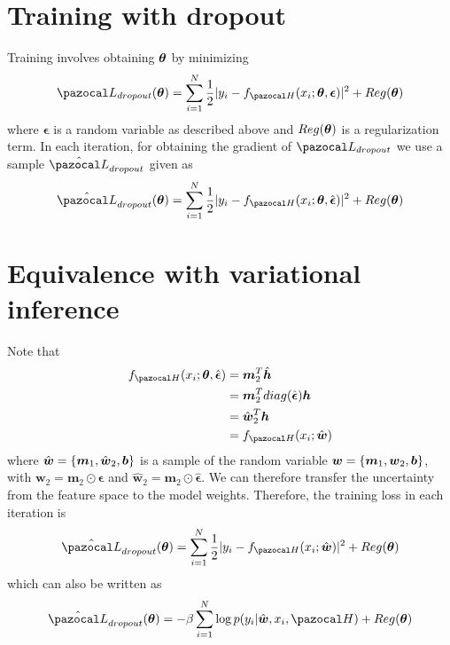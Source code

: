 \section{Training with dropout}
Training involves obtaining $\boldsymbol{\theta}$ by minimizing 
\begin{equation}
	\cL_{dropout}(\bth) = \sum_{i = 1}^{N} \frac{1}{2}|y_i - f_{\cH}(x_i;\bth, \boldsymbol{\epsilon})|^2 + Reg(\bth)
\end{equation}
where $\boldsymbol{\epsilon}$ is a random variable as described above and $Reg(\boldsymbol{\theta})$ is a regularization term. 
In each iteration, for obtaining the gradient of $\cL_{dropout}$ we use a sample $\hat{\cL}_{dropout}$ given as 
\begin{equation}
\hat{\cL}_{dropout}(\bth) = \sum_{i = 1}^{N} \frac{1}{2}|y_i - f_{\cH}(x_i;\bth, \hat{\boldsymbol{\epsilon}})|^2 + Reg(\bth)
\end{equation}

\section{Equivalence with variational inference}
Note that 
\begin{equation} \label{}
\begin{split}
f_{\cH}(x_i;\bth, \hat{\boldsymbol{\epsilon}}) &= \boldsymbol{m}_2^T\hat{\boldsymbol{h}}\\
& = \boldsymbol{m}_2^T diag(\hat{\boldsymbol{\epsilon}})\boldsymbol{h}\\
& = \hat{\boldsymbol{w}}_2^T\boldsymbol{h}\\
& = f_{\cH}(x_i;\hat{\bw})
\end{split}
\end{equation}
where $\hat{\boldsymbol{w}} = \{\boldsymbol{m}_1, \hat{\boldsymbol{w}}_2, \boldsymbol{b}\}$ is a sample of the random variable $\boldsymbol{w} = \{\boldsymbol{m}_1, \boldsymbol{w}_2, \boldsymbol{b}\}$, with $\boldsymbol{w}_2 = \boldsymbol{m}_2\odot \boldsymbol{\epsilon}$ and $\hat{\boldsymbol{w}}_2 = \boldsymbol{m}_2\odot \hat{\boldsymbol{\epsilon}}$. 
We can therefore transfer the uncertainty from the feature space to the model weights. 
Therefore, the training loss in each iteration is 
\begin{equation}
\hat{\cL}_{dropout}(\bth) = \sum_{i = 1}^{N} \frac{1}{2}|y_i - f_{\cH}(x_i;\hat{\bw})|^2 + Reg(\bth)
\end{equation}
which can also be written as
\begin{equation}\label{dropout_loss}
\hat{\cL}_{dropout}(\bth) = -\beta\sum_{i = 1}^{N} \log p(y_i|\hat{\bw},x_i,\cH) + Reg(\bth) 
\end{equation}

